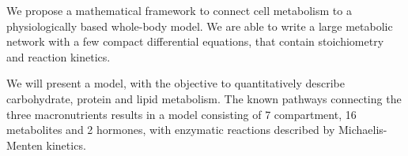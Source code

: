 We propose a mathematical framework to connect cell metabolism to a physiologically based whole-body model. We are able to write a large metabolic network with a few compact differential equations, that contain stoichiometry and reaction kinetics.

We will present a model, with the objective to quantitatively describe carbohydrate, protein and lipid metabolism. The known pathways connecting the three macronutrients results in a model consisting of 7 compartment, 16 metabolites and 2 hormones, with enzymatic reactions described by Michaelis-Menten kinetics. 
